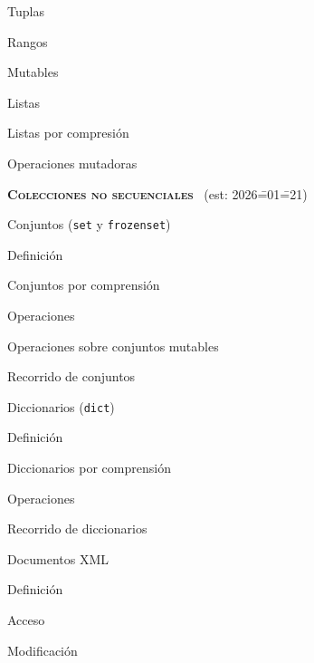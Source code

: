 \begin{longenum}
\begin{longenum}
\begin{longenum}
            \item Tuplas
            \item Rangos
        \end{longenum}
        \item Mutables
        \begin{longenum}
            \item Listas
            \begin{longenum}
                \item Listas por compresión
            \end{longenum}
            \item Operaciones mutadoras
        \end{longenum}
    \end{longenum}
    \item \textbf{\textsc{Colecciones no secuenciales}} \ (est: 2026\==01\==21)
    \begin{longenum}
        \item Conjuntos (\texttt{set} y \texttt{frozenset})
        \begin{longenum}
            \item Definición
            \item Conjuntos por comprensión
            \item Operaciones
            \item Operaciones sobre conjuntos mutables
            \item Recorrido de conjuntos
        \end{longenum}
        \item Diccionarios (\texttt{dict})
        \begin{longenum}
            \item Definición
            \item Diccionarios por comprensión
            \item Operaciones
            \item Recorrido de diccionarios
        \end{longenum}
        \item Documentos XML
        \begin{longenum}
            \item Definición
            \item Acceso
            \item Modificación
        \end{longenum}
    \end{longenum}

\end{longenum}
